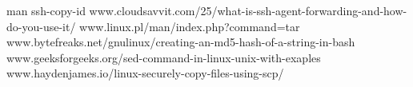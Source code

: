 \documentclass{article}
\begin{document}
\begin{thebibliography}{6}
    man ssh-copy-id
    www.cloudsavvit.com/25/what-is-ssh-agent-forwarding-and-how-do-you-use-it/
    www.linux.pl/man/index.php?command=tar
	www.bytefreaks.net/gnulinux/creating-an-md5-hash-of-a-string-in-bash
	www.geeksforgeeks.org/sed-command-in-linux-unix-with-exaples
	www.haydenjames.io/linux-securely-copy-files-using-scp/
    
\end{thebibliography}
 
\end{document}
